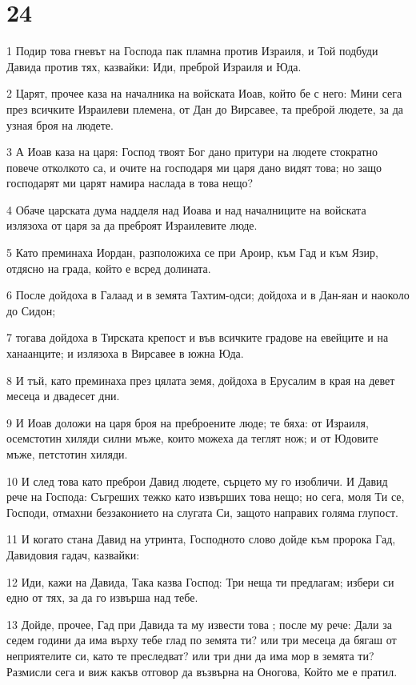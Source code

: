 \chapter{24}

\par 1 Подир това гневът на Господа пак пламна против Израиля, и Той подбуди Давида против тях, казвайки: Иди, преброй Израиля и Юда.
\par 2 Царят, прочее каза на началника на войската Иоав, който бе с него: Мини сега през всичките Израилеви племена, от Дан до Вирсавее, та преброй людете, за да узная броя на людете.
\par 3 А Иоав каза на царя: Господ твоят Бог дано притури на людете стократно повече отколкото са, и очите на господаря ми царя дано видят това; но защо господарят ми царят намира наслада в това нещо?
\par 4 Обаче царската дума надделя над Иоава и над началниците на войската излязоха от царя за да преброят Израилевите люде.
\par 5 Като преминаха Иордан, разположиха се при Ароир, към Гад и към Язир, отдясно на града, който е всред долината.
\par 6 После дойдоха в Галаад и в земята Тахтим-одси; дойдоха и в Дан-яан и наоколо до Сидон;
\par 7 тогава дойдоха в Тирската крепост и във всичките градове на евейците и на ханаанците; и излязоха в Вирсавее в южна Юда.
\par 8 И тъй, като преминаха през цялата земя, дойдоха в Ерусалим в края на девет месеца и двадесет дни.
\par 9 И Иоав доложи на царя броя на преброените люде; те бяха: от Израиля, осемстотин хиляди силни мъже, които можеха да теглят нож; и от Юдовите мъже, петстотин хиляди.
\par 10 И след това като преброи Давид людете, сърцето му го изобличи. И Давид рече на Господа: Съгреших тежко като извърших това нещо; но сега, моля Ти се, Господи, отмахни беззаконието на слугата Си, защото направих голяма глупост.
\par 11 И когато стана Давид на утринта, Господното слово дойде към пророка Гад, Давидовия гадач, казвайки:
\par 12 Иди, кажи на Давида, Така казва Господ: Три неща ти предлагам; избери си едно от тях, за да го извърша над тебе.
\par 13 Дойде, прочее, Гад при Давида та му извести това ; после му рече: Дали за седем години да има върху тебе глад по земята ти? или три месеца да бягаш от неприятелите си, като те преследват? или три дни да има мор в земята ти? Размисли сега и виж какъв отговор да възвърна на Оногова, Който ме е пратил.
